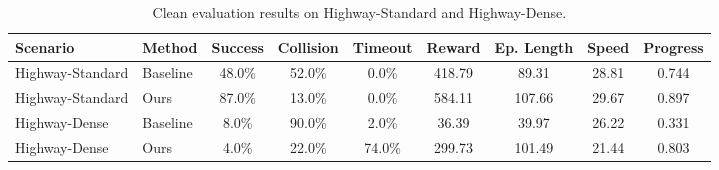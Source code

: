 \begin{table}[t]
\centering
\caption{Clean evaluation results on Highway-Standard and Highway-Dense.}
\label{tab:highway-clean-eval}
\small
\begin{tabular}{llccccccc}
\hline
Scenario & Method & Success & Collision & Timeout & Reward & Ep. Length & Speed & Progress \\
\hline
Highway-Standard & Baseline & 48.0\% & 52.0\% & 0.0\% & 418.79 & 89.31 & 28.81 & 0.744 \\
Highway-Standard & Ours     & 87.0\% & 13.0\% & 0.0\% & 584.11 & 107.66 & 29.67 & 0.897 \\
Highway-Dense    & Baseline & 8.0\%  & 90.0\% & 2.0\% & 36.39  & 39.97 & 26.22 & 0.331 \\
Highway-Dense    & Ours     & 4.0\%  & 22.0\% & 74.0\% & 299.73 & 101.49 & 21.44 & 0.803 \\
\hline
\end{tabular}
\end{table}
